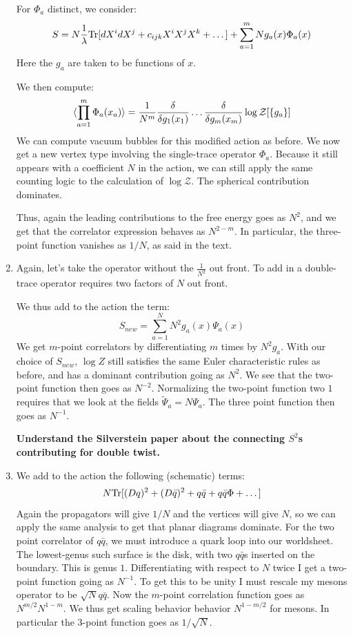 \documentclass[11pt, class=article, crop=false]{standalone}
\begin{document}
\begin{enumerate}
	For $\Phi_a$ distinct, we consider:
	\[
		S = N \frac{1}{\lambda} \mathrm{Tr}[d X^i d X^j + c_{ijk} X^i X^j X^k + \dots] + \sum_{a=1}^m N g_a(x)  \Phi_a (x)
	\]
	Here the $g_a$ are taken to be functions of $x$. %
	
	We then compute:
	\[
		\braket{ \prod_{a=1}^m \Phi_a(x_a)} = \frac{1}{N^m} \frac{\delta}{\delta g_1(x_1)} \dots \frac{\delta}{\delta g_m(x_m)}   \log \mathcal Z[\{g_a\}]
	\]
	We can compute vacuum bubbles for this modified action as before. We now get a new vertex type involving the single-trace operator $\Phi_a$. Because it still appears with a coefficient $N$ in the action, we can still apply the same counting logic to the calculation of $\log \mathcal Z$. The spherical contribution dominates.
	
	Thus, again the leading contributions to the free energy goes as $N^{2}$, and we get that the correlator expression behaves as $N^{2-m}$. In particular, the three-point function vanishes as $1/N$, as said in the text. 
	
	
	\item 
	Again, let's take the operator without the $\frac{1}{N^2}$ out front. To add in a double-trace operator requires two factors of $N$ out front. 
	
	We thus add to the action the term:
	\[
		S_{new} = \sum_{a=1}^N N^2 g_a(x) \Psi_a(x)
	\]
	We get $m$-point correlators by differentiating $m$ times by $N^2 g_a$. With our choice of $S_{new}$, $\log Z$ still satisfies the same Euler characteristic rules as before, and has a dominant contribution going as $N^2$. We see that the two-point function then goes as $N^{-2}$. Normalizing the two-point function two $1$ requires that we look at the fields $\tilde \Psi_a = N \Psi_a$. The three point function then goes as $N^{-1}$.
	
	\textbf{Understand the Silverstein paper about the connecting $S^2$s contributing for double twist.}
	
	\item We add to the action the following (schematic) terms:
	\[
		N \mathrm{Tr}[(D q)^2 + (D \bar q)^2 + q \bar q + q \bar q \Phi + \dots ]
	\]
	Again the propagators will give $1/N$ and the vertices will give $N$, so we can apply the same analysis to get that planar diagrams dominate. For the two point correlator of $q \bar q$, we must introduce a quark loop into our worldsheet. The lowest-genus such surface is the disk, with two $q \bar q$s inserted on the boundary. This is genus $1$. Differentiating with respect to $N$ twice I get a two-point function going as $N^{-1}$. To get this to be unity I must rescale my mesons operator to be $\sqrt{N} q \bar q$. Now the $m$-point correlation function goes as $N^{m/2} N^{1-m}$.
	We thus get scaling behavior behavior $N^{1-m/2}$ for mesons. In particular the 3-point function goes as $1/\sqrt{N}$. 
	

\end{enumerate}
\end{document}
